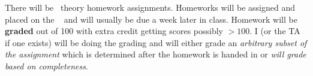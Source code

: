 There will be \numtheoryhws~theory homework assignments. Homeworks will be assigned and placed on the \coursewebpagelink~ and will usually be due a week later in class. Homework will be \textbf{graded} out of 100 with extra credit getting scores possibly $> 100$. I (or the TA if one exists) will be doing the grading and will either grade an \textit{arbitrary subset of the assignment} which is determined after the homework is handed in or \textit{will grade based on completeness}. 

